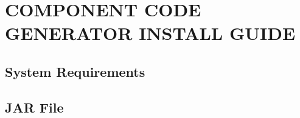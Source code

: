 \section{COMPONENT CODE GENERATOR INSTALL GUIDE}

\subsection{System Requirements}

\subsection{JAR File}
